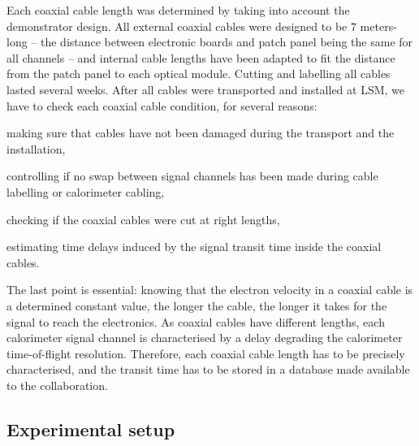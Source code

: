 Each coaxial cable length was determined by taking into account the demonstrator design.
All external coaxial cables were designed to be $7$ meters-long -- the distance between electronic boards and patch panel being the same for all channels -- and internal cable lengths have been adapted to fit the distance from the patch panel to each optical module.
Cutting and labelling all cables lasted several weeks.
After all cables were transported and installed at LSM, we have to check each coaxial cable condition, for several reasons:
\begin{itemize*}
\item making sure that cables have not been damaged during the transport and the installation,
\item controlling if no swap between signal channels has been made during cable labelling or calorimeter cabling,
\item checking if the coaxial cables were cut at right lengths,
\item estimating time delays induced by the signal transit time inside the coaxial cables.
\end{itemize*}
The last point is essential: knowing that the  electron velocity in a coaxial cable is a determined constant value, the longer the cable, the longer it takes for the signal to reach the electronics.
As coaxial cables have different lengths, each calorimeter signal channel is characterised by a delay degrading the calorimeter time-of-flight resolution.
Therefore, each coaxial cable length has to be precisely characterised, and the transit time has to be stored in a database made available to the collaboration.

\subsection{Experimental setup}

